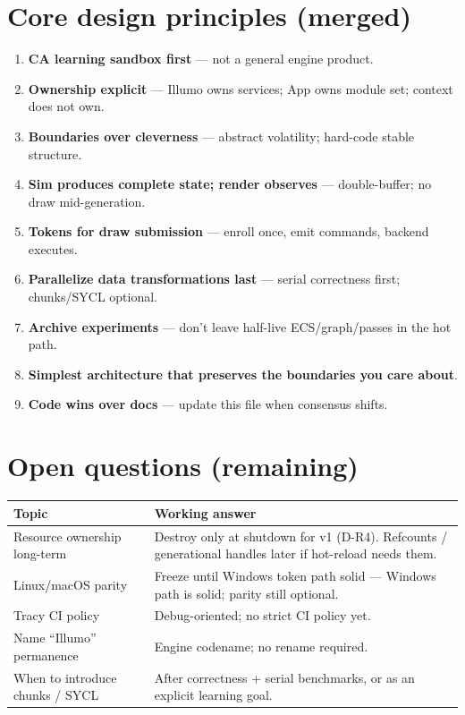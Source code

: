 \documentclass[10pt,a4paper]{article}
\begin{document}
\section{Core design principles (merged)}
\begin{enumerate}
    \item \textbf{CA learning sandbox first} --- not a general engine product.
    \item \textbf{Ownership explicit} --- Illumo owns services; App owns module set; context does not own.
    \item \textbf{Boundaries over cleverness} --- abstract volatility; hard-code stable structure.
    \item \textbf{Sim produces complete state; render observes} --- double-buffer; no draw mid-generation.
    \item \textbf{Tokens for draw submission} --- enroll once, emit commands, backend executes.
    \item \textbf{Parallelize data transformations last} --- serial correctness first; chunks/SYCL optional.
    \item \textbf{Archive experiments} --- don't leave half-live ECS/graph/passes in the hot path.
    \item \textbf{Simplest architecture that preserves the boundaries you care about}.
    \item \textbf{Code wins over docs} --- update this file when consensus shifts.
\end{enumerate}

\section{Open questions (remaining)}
\begin{table}[h!]
\centering
\small
\begin{tabularx}{\textwidth}{l X}
\toprule
\textbf{Topic} & \textbf{Working answer} \\
\midrule
Resource ownership long-term & Destroy only at shutdown for v1 (D-R4). Refcounts / generational handles later if hot-reload needs them. \\
Linux/macOS parity & Freeze until Windows token path solid --- Windows path is solid; parity still optional. \\
Tracy CI policy & Debug-oriented; no strict CI policy yet. \\
Name ``Illumo'' permanence & Engine codename; no rename required. \\
When to introduce chunks / SYCL & After correctness + serial benchmarks, or as an explicit learning goal. \\
\bottomrule
\end{tabularx}
\end{table}
\end{document}
